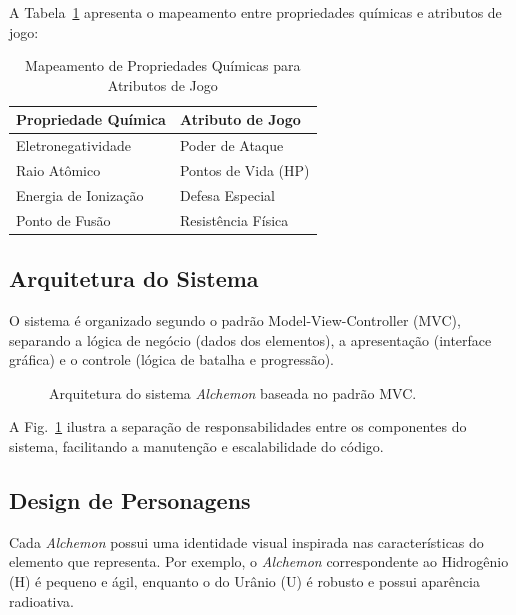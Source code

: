 A Tabela~\ref{tab:atributos} apresenta o mapeamento entre propriedades
químicas e atributos de jogo:

\begin{table}[htbp]
    \centering
    \caption{Mapeamento de Propriedades Químicas para Atributos de Jogo}
    \label{tab:atributos}
    \begin{tabular}{@{}ll@{}}
        \toprule
        \textbf{Propriedade Química} & \textbf{Atributo de Jogo} \\
        \midrule
        Eletronegatividade           & Poder de Ataque           \\
        Raio Atômico                 & Pontos de Vida (HP)       \\
        Energia de Ionização         & Defesa Especial           \\
        Ponto de Fusão               & Resistência Física        \\
        \bottomrule
    \end{tabular}
\end{table}

\subsection{Arquitetura do Sistema}

O sistema é organizado segundo o padrão Model-View-Controller (MVC),
separando a lógica de negócio (dados dos elementos), a apresentação
(interface gráfica) e o controle (lógica de batalha e progressão).

\begin{figure}[htbp]
    \centering
    \caption{Arquitetura do sistema \textit{Alchemon} baseada no padrão MVC.}
    \label{fig:arquitetura}
\end{figure}

A Fig.~\ref{fig:arquitetura} ilustra a separação de responsabilidades entre
os componentes do sistema, facilitando a manutenção e escalabilidade do
código.

\subsection{Design de Personagens}

Cada \textit{Alchemon} possui uma identidade visual inspirada nas
características do elemento que representa. Por exemplo, o \textit{Alchemon}
correspondente ao Hidrogênio (H) é pequeno e ágil, enquanto o do Urânio (U)
é robusto e possui aparência radioativa.

